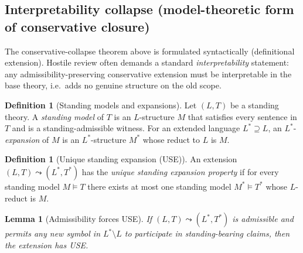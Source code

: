 \documentclass[11pt]{article}
\newtheorem{lemma}[theorem]{Lemma}
\theoremstyle{definition}
\newtheorem{definition}[theorem]{Definition}
\begin{document}
\subsection{Interpretability collapse (model-theoretic form of conservative closure)}
\label{sec:interpretability}

The conservative-collapse theorem above is formulated syntactically (definitional extension).
Hostile review often demands a standard \emph{interpretability} statement: any admissibility-preserving conservative
extension must be interpretable in the base theory, i.e.\ adds no genuine structure on the old scope.

\begin{definition}[Standing models and expansions]
Let $(L,T)$ be a standing theory.
A \emph{standing model} of $T$ is an $L$-structure $M$ that satisfies every sentence in $T$ and is a standing-admissible witness.
For an extended language $L^*\supseteq L$, an $L^*$-\emph{expansion} of $M$ is an $L^*$-structure $M^*$ whose reduct to $L$ is $M$.
\end{definition}

\begin{definition}[Unique standing expansion (USE)]
An extension $(L,T)\leadsto(L^*,T^*)$ has the \emph{unique standing expansion property} if for every standing model $M\models T$
there exists at most one standing model $M^*\models T^*$ whose $L$-reduct is $M$.
\end{definition}

\begin{lemma}[Admissibility forces USE]
\label{lem:USE}
If $(L,T)\leadsto(L^*,T^*)$ is admissible and permits any new symbol in $L^*\setminus L$ to participate in standing-bearing claims,
then the extension has USE.
\end{lemma}
\end{document}
